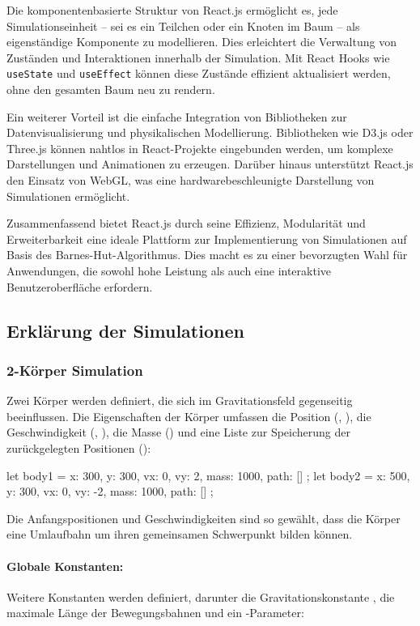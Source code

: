 \documentclass[a4paper,12pt,twoside]{article}
\begin{document}
Die komponentenbasierte Struktur von React.js ermöglicht es, jede Simulationseinheit -- sei es ein Teilchen oder ein Knoten im Baum -- als eigenständige Komponente zu modellieren. Dies erleichtert die Verwaltung von Zuständen und Interaktionen innerhalb der Simulation. Mit React Hooks wie \texttt{useState} und \texttt{useEffect} können diese Zustände effizient aktualisiert werden, ohne den gesamten Baum neu zu rendern.

Ein weiterer Vorteil ist die einfache Integration von Bibliotheken zur Datenvisualisierung und physikalischen Modellierung. Bibliotheken wie D3.js oder Three.js können nahtlos in React-Projekte eingebunden werden, um komplexe Darstellungen und Animationen zu erzeugen. Darüber hinaus unterstützt React.js den Einsatz von WebGL, was eine hardwarebeschleunigte Darstellung von Simulationen ermöglicht.

Zusammenfassend bietet React.js durch seine Effizienz, Modularität und Erweiterbarkeit eine ideale Plattform zur Implementierung von Simulationen auf Basis des Barnes-Hut-Algorithmus. Dies macht es zu einer bevorzugten Wahl für Anwendungen, die sowohl hohe Leistung als auch eine interaktive Benutzeroberfläche erfordern.

\subsection{Erklärung der Simulationen}
\subsubsection{2-Körper Simulation}
Zwei Körper werden definiert, die sich im Gravitationsfeld gegenseitig beeinflussen. Die Eigenschaften der Körper umfassen die Position (, ), die Geschwindigkeit (, ), die Masse () und eine Liste zur Speicherung der zurückgelegten Positionen ():

\begin{javascript}
let body1 = { x: 300, y: 300, vx: 0, vy: 2, mass: 1000, path: [] };
let body2 = { x: 500, y: 300, vx: 0, vy: -2, mass: 1000, path: [] };
\end{javascript}

Die Anfangspositionen und Geschwindigkeiten sind so gewählt, dass die Körper eine Umlaufbahn um ihren gemeinsamen Schwerpunkt bilden können.

\paragraph{Globale Konstanten:}
Weitere Konstanten werden definiert, darunter die Gravitationskonstante , die maximale Länge der Bewegungsbahnen und ein -Parameter:
\end{document}
